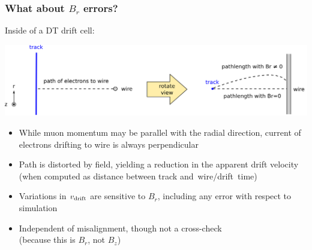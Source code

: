 \documentclass[compress]{beamer}
\begin{document}
\begin{frame}
\frametitle{What about $B_r$ errors?}

\vspace{0.5 cm}
Inside of a DT drift cell:

\vspace{0.2 cm}
\includegraphics[width=\linewidth]{drift_explanation.png}

\vfill
\begin{itemize}
\item While muon momentum may be parallel with the radial direction,
  current of electrons drifting to wire is always perpendicular
\item Path is distorted by field, yielding a reduction in the
  apparent drift velocity (when computed as distance
  between track \mbox{and wire$/$drift time)\hspace{-1 cm}}
\item Variations in $v_{\mbox{\scriptsize drift}}$ are sensitive to
  $B_r$, including any error with respect to simulation
\item Independent of misalignment, though not a cross-check \\ (because this is $B_r$, not $B_z$)
\end{itemize}
\end{frame}
\end{document}
